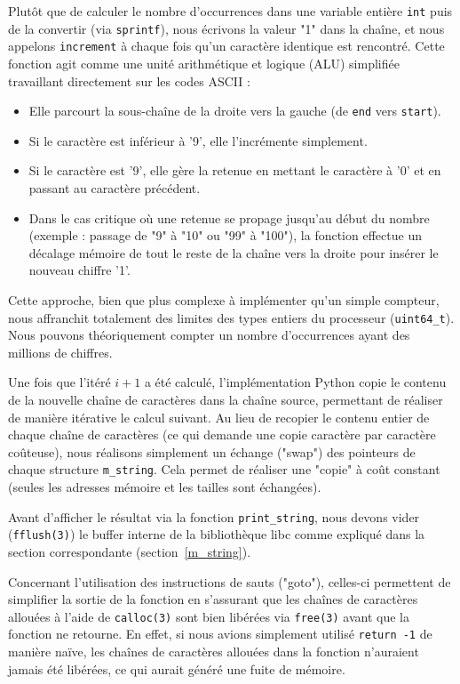 \documentclass[a4paper,11pt]{article}
\begin{document}
Plutôt que de calculer le nombre d'occurrences dans une variable entière \texttt{int} puis de la convertir (via \texttt{sprintf}), nous écrivons la valeur "1" dans la chaîne, et nous appelons \texttt{increment} à chaque fois qu'un caractère identique est rencontré. Cette fonction agit comme une unité arithmétique et logique (ALU) simplifiée travaillant directement sur les codes ASCII :

\begin{itemize} 
    \item Elle parcourt la sous-chaîne de la droite vers la gauche (de \texttt{end} vers \texttt{start}). 
    \item Si le caractère est inférieur à '9', elle l'incrémente simplement. 
    \item Si le caractère est '9', elle gère la retenue en mettant le caractère à '0' et en passant au caractère précédent. 
    \item Dans le cas critique où une retenue se propage jusqu'au début du nombre (exemple : passage de "9" à "10" ou "99" à "100"), la fonction effectue un décalage mémoire de tout le reste de la chaîne vers la droite pour insérer le nouveau chiffre '1'. 
\end{itemize}

Cette approche, bien que plus complexe à implémenter qu'un simple compteur, nous affranchit totalement des limites des types entiers du processeur (\texttt{uint64\_t}). Nous pouvons théoriquement compter un nombre d'occurrences ayant des millions de chiffres.

Une fois que l'itéré $i+1$ a été calculé, l'implémentation Python copie le contenu de la nouvelle chaîne de caractères dans la chaîne source, permettant de réaliser de manière itérative le calcul suivant. Au lieu de recopier le contenu entier de chaque chaîne de caractères (ce qui demande une copie caractère par caractère coûteuse), nous réalisons simplement un échange ("swap") des pointeurs de chaque structure \texttt{m\_string}. Cela permet de réaliser une "copie" à coût constant (seules les adresses mémoire et les tailles sont échangées).

Avant d'afficher le résultat via la fonction \texttt{print\_string}, nous devons vider (\texttt{fflush(3)}) le buffer interne de la bibliothèque libc comme expliqué dans la section correspondante (section~\ref{m_string}).

Concernant l'utilisation des instructions de sauts ("goto"), celles-ci permettent de simplifier la sortie de la fonction en s'assurant que les chaînes de caractères allouées à l'aide de \texttt{calloc(3)} sont bien libérées via \texttt{free(3)} avant que la fonction ne retourne. En effet, si nous avions simplement utilisé \texttt{return -1} de manière naïve, les chaînes de caractères allouées dans la fonction n'auraient jamais été libérées, ce qui aurait généré une fuite de mémoire.
\end{document}
